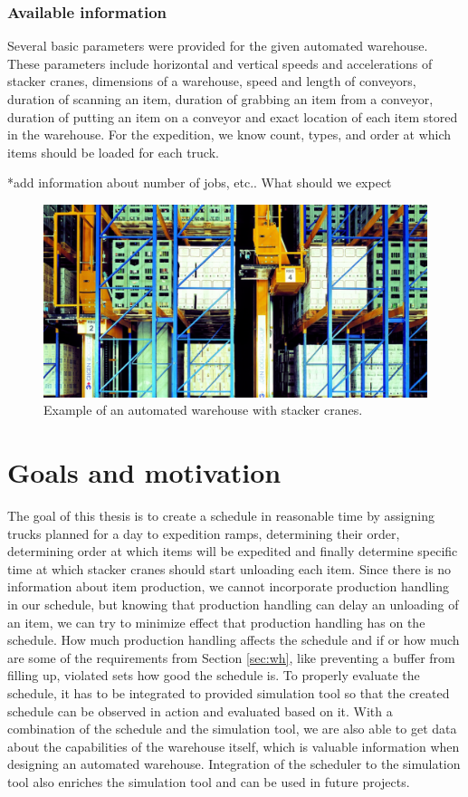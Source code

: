 \documentclass{ctuthesis}
\begin{document}
\subsubsection{Available information}

Several basic parameters were provided for the given automated warehouse. These parameters include horizontal and vertical speeds and accelerations of stacker cranes, dimensions of a warehouse, speed and length of conveyors, duration of scanning an item, duration of grabbing an item from a conveyor, duration of putting an item on a conveyor and exact location of each item stored in the warehouse. For the expedition, we know count, types, and order at which items should be loaded for each truck. 

*add information about number of jobs, etc.. What should we expect

\begin{figure}
\includegraphics[width=0.8\linewidth]{highbaywarehouse.jpg}
\caption{Example of an automated warehouse with stacker cranes. \cite{warehousepic}}
\label{fig:foobar}
\end{figure}

\section{Goals and motivation}

The goal of this thesis is to create a schedule in reasonable time by assigning trucks planned for a day to expedition ramps, determining their order, determining order at which items will be expedited and finally determine specific time at which stacker cranes should start unloading each item. Since there is no information about item production, we cannot incorporate production handling in our schedule, but knowing that production handling can delay an unloading of an item, we can try to minimize effect that production handling has on the schedule. How much production handling affects the schedule and if or how much are some of the requirements from Section \ref{sec:wh}, like preventing a buffer from filling up, violated sets how good the schedule is. To properly evaluate the schedule, it has to be integrated to provided simulation tool so that the created schedule can be observed in action and evaluated based on it. With a combination of the schedule and the simulation tool, we are also able to get data about the capabilities of the warehouse itself, which is valuable information when designing an automated warehouse. Integration of the scheduler to the simulation tool also enriches the simulation tool and can be used in future projects.
\end{document}

